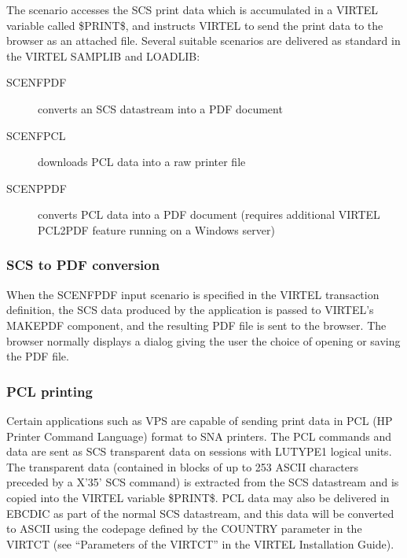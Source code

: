\documentclass[letterpaper,10pt,english]{sphinxmanual}
\begin{document}

The scenario accesses the SCS print data which is accumulated in a VIRTEL variable called \$PRINT\$, and instructs
VIRTEL to send the print data to the browser as an attached file.
Several suitable scenarios are delivered as standard in the VIRTEL SAMPLIB and LOADLIB:
\begin{description}
\item[{SCENFPDF}] \leavevmode
converts an SCS datastream into a PDF document

\item[{SCENFPCL}] \leavevmode
downloads PCL data into a raw printer file

\item[{SCENPPDF}] \leavevmode
converts PCL data into a PDF document (requires additional VIRTEL PCL2PDF feature running on a Windows server)

\end{description}


\subsubsection{SCS to PDF conversion}
\label{\detokenize{User_Guide:scs-to-pdf-conversion}}
When the SCENFPDF input scenario is specified in the VIRTEL transaction definition, the SCS data produced by the
application is passed to VIRTEL’s MAKEPDF component, and the resulting PDF file is sent to the browser. The browser
normally displays a dialog giving the user the choice of opening or saving the PDF file.


\subsubsection{PCL printing}
\label{\detokenize{User_Guide:pcl-printing}}
Certain applications such as VPS are capable of sending print data in PCL (HP Printer Command Language) format to
SNA printers. The PCL commands and data are sent as SCS transparent data on sessions with LUTYPE1 logical units.
The transparent data (contained in blocks of up to 253 ASCII characters preceded by a X’35’ SCS command) is extracted
from the SCS datastream and is copied into the VIRTEL variable \$PRINT\$.
PCL data may also be delivered in EBCDIC as part of the normal SCS datastream, and this data will be converted to
ASCII using the codepage defined by the COUNTRY parameter in the VIRTCT (see “Parameters of the VIRTCT” in the
VIRTEL Installation Guide).
\end{document}
